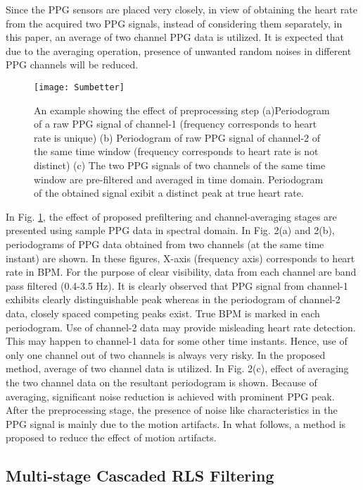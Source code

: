 \documentclass[final,3p,times,authoryear]{elsarticle}
\begin{document}
Since the PPG sensors are placed very closely, in view of obtaining the heart rate from the acquired two PPG signals, instead of considering them separately, in this paper, an average of two channel PPG data is utilized. It is expected that due to the averaging operation, presence of unwanted random noises in different PPG channels will be reduced.

\begin{figure}[h]
  \centering
  \texttt{[image: Sumbetter]}\\
  \caption{ An example showing the effect of preprocessing step (a)Periodogram of a raw PPG signal of channel-1 (frequency corresponds to heart rate is unique)  (b) Periodogram of raw PPG signal of channel-2 of the same time window (frequency corresponds to heart rate is not distinct)  (c) The two PPG signals of two channels of the same time window are pre-filtered and averaged in time domain. Periodogram of the obtained signal exibit a distinct peak at true heart rate.}\label{Fig:prefiltering}
\end{figure}

In Fig. \ref{Fig:prefiltering}, the effect of proposed prefiltering and channel-averaging stages are presented using sample PPG data in spectral domain. In Fig. 2(a) and 2(b), periodograms of PPG data obtained from two channels (at the same time instant) are shown. In these figures, X-axis (frequency axis) corresponds to heart rate in BPM. For the purpose of clear visibility, data from each channel are band pass filtered (0.4-3.5 Hz). It is clearly observed that PPG signal from channel-1 exhibits clearly distinguishable peak whereas in the periodogram of channel-2 data, closely spaced competing peaks exist. True BPM is marked in each periodogram. Use of channel-2 data may provide misleading heart rate detection. This may happen to channel-1 data for some other time instants. Hence, use of only one channel out of two channels is always very risky. In the proposed method, average of two channel data is utilized. In Fig. 2(c), effect of averaging the two channel data on the resultant periodogram is shown. Because of averaging, significant noise reduction is achieved with prominent PPG peak. After the preprocessing stage, the presence of noise like characteristics in the PPG signal is mainly due to the motion artifacts. In what follows, a method is proposed to reduce the effect of motion artifacts.



\subsection{Multi-stage Cascaded RLS Filtering}
\end{document}
